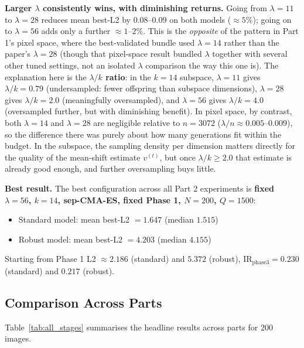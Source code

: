 \documentclass[11pt, a4paper]{article}
\begin{document}
\textbf{Larger $\lambda$ consistently wins, with diminishing returns.} Going from $\lambda=11$ to $\lambda=28$ reduces mean best-L2 by $0.08$--$0.09$ on both models ($\approx5\%$); going on to $\lambda=56$ adds only a further $\approx1$--$2\%$. This is the \emph{opposite} of the pattern in Part 1's pixel space, where the best-validated bundle used $\lambda=14$ rather than the paper's $\lambda=28$ (though that pixel-space result bundled $\lambda$ together with several other tuned settings, not an isolated $\lambda$ comparison the way this one is). The explanation here is the \textbf{$\lambda/k$ ratio}: in the $k=14$ subspace, $\lambda=11$ gives $\lambda/k=0.79$ (undersampled: fewer offspring than subspace dimensions), $\lambda=28$ gives $\lambda/k=2.0$ (meaningfully oversampled), and $\lambda=56$ gives $\lambda/k=4.0$ (oversampled further, but with diminishing benefit). In pixel space, by contrast, both $\lambda=14$ and $\lambda=28$ are negligible relative to $n=3072$ ($\lambda/n\approx0.005$--$0.009$), so the difference there was purely about how many generations fit within the budget. In the subspace, the sampling density per dimension matters directly for the quality of the mean-shift estimate $v^{(t)}$, but once $\lambda/k\geq2.0$ that estimate is already good enough, and further oversampling buys little.

\textbf{Best result.} The best configuration across all Part 2 experiments is \textbf{fixed $\lambda=56$, $k=14$, sep-CMA-ES, fixed Phase 1, $N=200$, $Q=1500$}:
\begin{itemize}[noitemsep]
  \item Standard model: mean best-L2 $= 1.647$ (median $1.515$)
  \item Robust model: mean best-L2 $= 4.203$ (median $4.155$)
\end{itemize}
Starting from Phase 1 L2 $\approx2.186$ (standard) and $5.372$ (robust), IR$_\text{phase3}=0.230$ (standard) and $0.217$ (robust).

\subsection{Comparison Across Parts}

Table~\ref{tab:all_stages} summarises the headline results across parts for 200 images.
\end{document}

